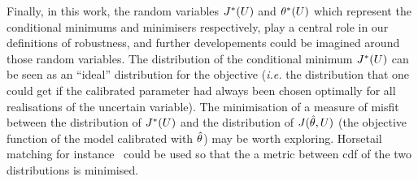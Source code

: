 \documentclass[../../Main_ManuscritThese.tex]{subfiles}
\begin{document}
Finally, in this work, the random variables $J^*(U)$ and
$\theta^*(U)$ which represent the conditional minimums and minimisers
respectively, play a central role in our definitions of robustness,
and further developements could be imagined around those random
variables.
The distribution of the conditional minimum $J^*(U)$ can be seen as
an ``ideal'' distribution for the objective (\emph{i.e.} the
distribution that one could get if the calibrated parameter had always
been chosen optimally for all realisations of the uncertain
variable). The minimisation of a measure of misfit between the
distribution of $J^*(U)$ and the distribution of $J(\hat{\theta},U)$
(the objective function of the model calibrated with $\hat{\theta}$) may
be worth exploring. Horsetail matching for
instance~\citep{cook_extending_2017,cook_horsetail_2018} could be used
so that the a metric between cdf of the two distributions is minimised.
\thispagestyle{plain}
\markchapterend
\subfileLocal{
	\pagestyle{empty}
	
        
}

\end{document}
